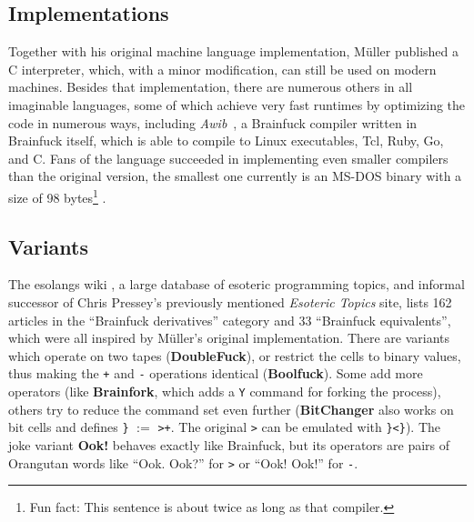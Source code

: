 \subsection{Implementations}

Together with his original machine language implementation, Müller published a C interpreter, which, with a minor modification, can still be used on modern machines. Besides that implementation, there are numerous others in all imaginable languages, some of which achieve very fast runtimes by optimizing the code in numerous ways, including \emph{Awib}~\cite{linander_awib}, a Brainfuck compiler written in Brainfuck itself, which is able to compile to Linux executables, Tcl, Ruby, Go, and C. Fans of the language succeeded in implementing even smaller compilers than the original version, the smallest one currently is an MS-DOS binary with a size of 98 bytes\footnote{Fun fact: This sentence is about twice as long as that compiler.} \cite{inte1999entry}.

\subsection{Variants}
\label{sec:brainfuck_variants}

The esolangs wiki \cite{esolang}, a large database of esoteric programming topics, and informal successor of Chris Pressey's previously mentioned \emph{Esoteric Topics} site, lists 162 articles in the “Brainfuck derivatives” category and 33 “Brainfuck equivalents”, which were all inspired by Müller's original implementation. There are variants which operate on two tapes (\textbf{DoubleFuck}), or restrict the cells to binary values, thus making the \texttt{+} and \texttt{-} operations identical (\textbf{Boolfuck}). Some add more operators (like \textbf{Brainfork}, which adds a \texttt{Y} command for forking the process), others try to reduce the command set even further (\textbf{BitChanger} also works on bit cells and defines \texttt{\}} $:=$ \texttt{>+}. The original \texttt{>} can be emulated with \texttt{\}<\}}).
The joke variant \textbf{Ook!} behaves exactly like Brainfuck, but its operators are pairs of Orangutan words like “Ook. Ook?” for \texttt{>} or “Ook! Ook!” for \texttt{-}.

